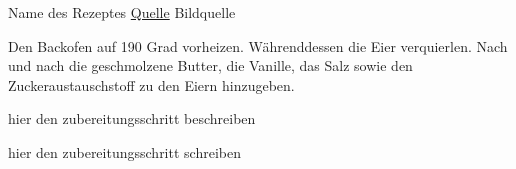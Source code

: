 \begin{recipe}[]{ Name des Rezeptes }{ \href{URL}{Quelle} }{ Bildquelle }


%

\step
Den Backofen auf 190 Grad vorheizen. Währenddessen die Eier verquierlen. Nach und nach die geschmolzene Butter, die Vanille, das Salz sowie den Zuckeraustauschstoff zu den Eiern hinzugeben.

\step
hier den zubereitungsschritt beschreiben


\step
hier den zubereitungsschritt schreiben




\end{recipe}
